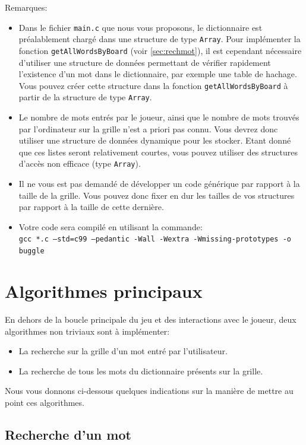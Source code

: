 \documentclass[a4paper,10pt]{article}
\begin{document}
Remarques:
\begin{itemize}
\item Dans le fichier \texttt{main.c} que nous vous proposons, le
  dictionnaire est préalablement chargé dans une structure de type
  \texttt{Array}. Pour implémenter la fonction
  \texttt{getAllWordsByBoard} (voir \ref{sec:rechmot}), il est
  cependant nécessaire d'utiliser une structure de données permettant
  de vérifier rapidement l'existence d'un mot dans le dictionnaire,
  par exemple une table de hachage. Vous pouvez créer cette structure
  dans la fonction \texttt{getAllWordsByBoard} à partir de la
  structure de type \texttt{Array}.
\item Le nombre de mots entrés par le joueur, ainsi que le nombre de
  mots trouvés par l'ordinateur sur la grille n'est a priori pas
  connu. Vous devrez donc utiliser une structure de données dynamique
  pour les stocker. Etant donné que ces listes seront relativement
  courtes, vous pouvez utiliser des structures d'accès non efficace
  (type \texttt{Array}).
\item Il ne vous est pas demandé de développer un code générique par
  rapport à la taille de la grille. Vous pouvez donc fixer en dur les
  tailles de vos structures par rapport à la taille de cette dernière.
\item Votre code sera compilé en utilisant la commande:\\
  \texttt{gcc *.c --std=c99 --pedantic -Wall -Wextra -Wmissing-prototypes -o buggle}
\end{itemize}

\section{Algorithmes principaux}

En dehors de la boucle principale du jeu et des interactions avec
le joueur, deux algorithmes non triviaux sont à implémenter:
\begin{itemize}
\item La recherche sur la grille d'un mot entré par l'utilisateur.
\item La recherche de tous les mots du dictionnaire présents sur la
  grille.
\end{itemize}

Nous vous donnons ci-dessous quelques indications sur la manière de
mettre au point ces algorithmes.

\subsection{Recherche d'un mot}
\end{document}
